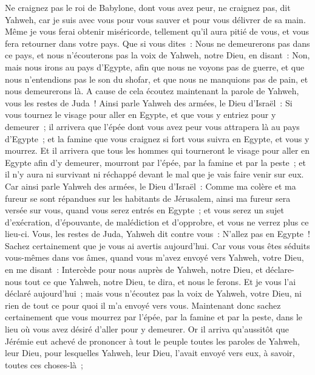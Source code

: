 \begin{multicols}{2}
Ne craignez pas le roi de Babylone, dont vous avez peur, ne craignez pas, dit Yahweh, car je suis avec vous pour vous sauver et pour vous délivrer de sa main.
Même je vous ferai obtenir miséricorde, tellement qu'il aura pitié de vous, et vous fera retourner dans votre pays.
Que si vous dites~: Nous ne demeurerons pas dans ce pays, et nous n'écouterons pas la voix de Yahweh, notre Dieu,
en disant~: Non, mais nous irons au pays d'Egypte, afin que nous ne voyons pas de guerre, et que nous n'entendions pas le son du shofar, et que nous ne manquions pas de pain, et nous demeurerons là.
A cause de cela écoutez maintenant la parole de Yahweh, vous les restes de Juda~! Ainsi parle Yahweh des armées, le Dieu d'Israël~: Si vous tournez le visage pour aller en Egypte, et que vous y entriez pour y demeurer~;
il arrivera que l'épée dont vous avez peur vous attrapera là au pays d'Egypte~; et la famine que vous craignez si fort vous suivra en Egypte, et vous y mourrez.
Et il arrivera que tous les hommes qui tourneront le visage pour aller en Egypte afin d'y demeurer, mourront par l'épée, par la famine et par la peste~; et il n'y aura ni survivant ni réchappé devant le mal que je vais faire venir sur eux.
Car ainsi parle Yahweh des armées, le Dieu d'Israël~: Comme ma colère et ma fureur se sont répandues sur les habitants de Jérusalem, ainsi ma fureur sera versée sur vous, quand vous serez entrés en Egypte~; et vous serez un sujet d'exécration, d'épouvante, de malédiction et d'opprobre, et vous ne verrez plus ce lieu-ci.
Vous, les restes de Juda, Yahweh dit contre vous~: N'allez pas en Egypte~! Sachez certainement que je vous ai avertis aujourd'hui.
Car vous vous êtes séduits vous-mêmes dans vos âmes, quand vous m'avez envoyé vers Yahweh, votre Dieu, en me disant~: Intercède pour nous auprès de Yahweh, notre Dieu, et déclare-nous tout ce que Yahweh, notre Dieu, te dira, et nous le ferons.
Et je vous l'ai déclaré aujourd'hui~; mais vous n'écoutez pas la voix de Yahweh, votre Dieu, ni rien de tout ce pour quoi il m'a envoyé vers vous.
Maintenant donc sachez certainement que vous mourrez par l'épée, par la famine et par la peste, dans le lieu où vous avez désiré d'aller pour y demeurer.
\VerseOne{}Or il arriva qu'aussitôt que Jérémie eut achevé de prononcer à tout le peuple toutes les paroles de Yahweh, leur Dieu, pour lesquelles Yahweh, leur Dieu, l'avait envoyé vers eux, à savoir, toutes ces choses-là~;

\end{multicols}
